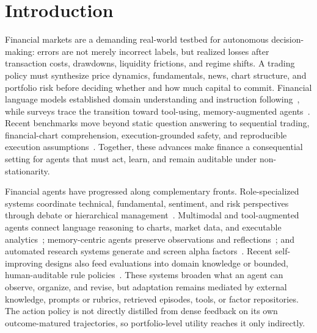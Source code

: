 \section{Introduction}
\label{sec:intro}

Financial markets are a demanding real-world testbed for autonomous decision-making: errors are not merely incorrect labels, but realized losses after transaction costs, drawdowns, liquidity frictions, and regime shifts. A trading policy must synthesize price dynamics, fundamentals, news, chart structure, and portfolio risk before deciding whether and how much capital to commit. Financial language models established domain understanding and instruction following~\cite{wu2023bloomberggpt,liu2023fingpt}, while surveys trace the transition toward tool-using, memory-augmented agents~\cite{li2023large,zhao2024revolutionizing,wang2024survey}. Recent benchmarks move beyond static question answering to sequential trading, financial-chart comprehension, execution-grounded safety, and reproducible execution assumptions~\cite{stockbench2025,finchartbench2025,finvault2026,yao2026execution}. Together, these advances make finance a consequential setting for agents that must act, learn, and remain auditable under non-stationarity.

Financial agents have progressed along complementary fronts. Role-specialized systems coordinate technical, fundamental, sentiment, and risk perspectives through debate or hierarchical management~\cite{tradingagents2025,fincon2024,hedgeagents2025,finteam2025}. Multimodal and tool-augmented agents connect language reasoning to charts, market data, and executable analytics~\cite{finagent2024}; memory-centric agents preserve observations and reflections~\cite{yu2023finmem,reflexion2023}; and automated research systems generate and screen alpha factors~\cite{rdagent2025,alphaagent2025,factorminer2026,hubble2026}. Recent self-improving designs also feed evaluations into domain knowledge or bounded, human-auditable rule policies~\cite{quantagent2024,sharp2026}. These systems broaden what an agent can observe, organize, and revise, but adaptation remains mediated by external knowledge, prompts or rubrics, retrieved episodes, tools, or factor repositories. The action policy is not directly distilled from dense feedback on its own outcome-matured trajectories, so portfolio-level utility reaches it only indirectly.


